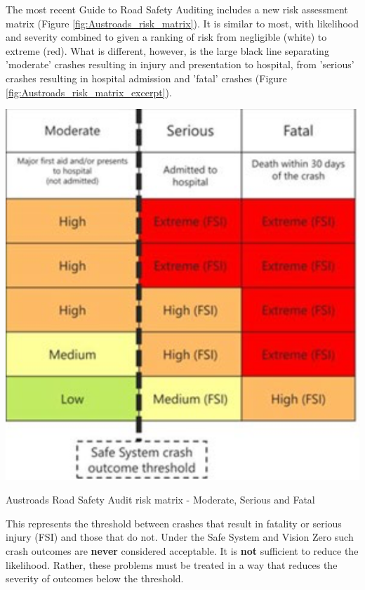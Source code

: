 \documentclass{tufte-handout}
\begin{document}
The most recent Guide to Road Safety Auditing\cite{Hillier:2022aa} includes a new risk assessment matrix (Figure \ref{fig:Austroads_risk_matrix}). It is similar to most, with likelihood and severity combined to given a ranking of risk from negligible (white) to extreme (red). What is different, however, is the large black line separating 'moderate' crashes resulting in injury and presentation to hospital, from 'serious' crashes resulting in hospital admission and 'fatal' crashes (Figure \ref{fig:Austroads_risk_matrix_excerpt}).  

\begin{marginfigure}
\includegraphics{Austroads_risk_matrix_excerpt}
\caption{Austroads Road Safety Audit risk matrix - Moderate, Serious and Fatal}
\label{fig:Austroads_risk_matrix_excerpt}
\end{marginfigure}

This represents the threshold between crashes that result in fatality or serious injury (FSI) and those that do not. Under the Safe System and Vision Zero such crash outcomes are \textbf{never} considered acceptable.  It is \textbf{not} sufficient to reduce the likelihood. Rather, these problems must be treated in a way that reduces the severity of outcomes below the threshold.   
\end{document}
